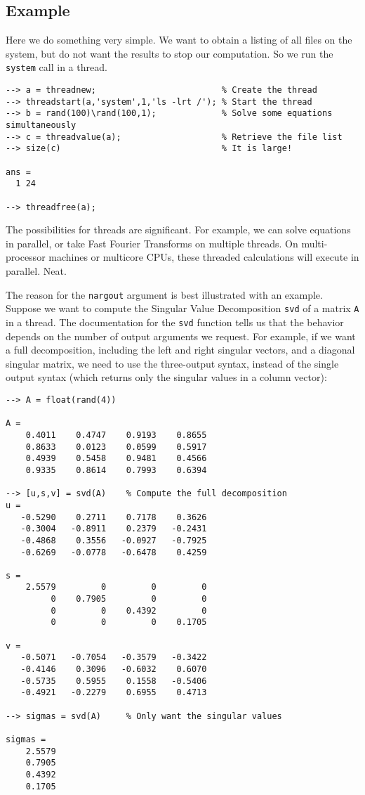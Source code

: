 \subsection{Example}

Here we do something very simple.  We want to obtain a listing of
all files on the system, but do not want the results to stop our
computation.  So we run the \verb|system| call in a thread.
\begin{verbatim}
--> a = threadnew;                         % Create the thread
--> threadstart(a,'system',1,'ls -lrt /'); % Start the thread
--> b = rand(100)\rand(100,1);             % Solve some equations simultaneously
--> c = threadvalue(a);                    % Retrieve the file list
--> size(c)                                % It is large!

ans = 
  1 24 

--> threadfree(a);
\end{verbatim}
The possibilities for threads are significant.  For example,
we can solve equations in parallel, or take Fast Fourier Transforms
on multiple threads.  On multi-processor machines or multicore CPUs,
these threaded calculations will execute in parallel.  Neat.

The reason for the  \verb|nargout| argument is best illustrated with
an example.  Suppose we want to compute the Singular Value 
Decomposition \verb|svd| of a matrix \verb|A| in a thread.  
The documentation for the \verb|svd| function tells us that
the behavior depends on the number of output arguments we request.
For example, if we want a full decomposition, including the left 
and right singular vectors, and a diagonal singular matrix, we
need to use the three-output syntax, instead of the single output
syntax (which returns only the singular values in a column vector):
\begin{verbatim}
--> A = float(rand(4))

A = 
    0.4011    0.4747    0.9193    0.8655 
    0.8633    0.0123    0.0599    0.5917 
    0.4939    0.5458    0.9481    0.4566 
    0.9335    0.8614    0.7993    0.6394 

--> [u,s,v] = svd(A)    % Compute the full decomposition
u = 
   -0.5290    0.2711    0.7178    0.3626 
   -0.3004   -0.8911    0.2379   -0.2431 
   -0.4868    0.3556   -0.0927   -0.7925 
   -0.6269   -0.0778   -0.6478    0.4259 

s = 
    2.5579         0         0         0 
         0    0.7905         0         0 
         0         0    0.4392         0 
         0         0         0    0.1705 

v = 
   -0.5071   -0.7054   -0.3579   -0.3422 
   -0.4146    0.3096   -0.6032    0.6070 
   -0.5735    0.5955    0.1558   -0.5406 
   -0.4921   -0.2279    0.6955    0.4713 

--> sigmas = svd(A)     % Only want the singular values

sigmas = 
    2.5579 
    0.7905 
    0.4392 
    0.1705 
\end{verbatim}

